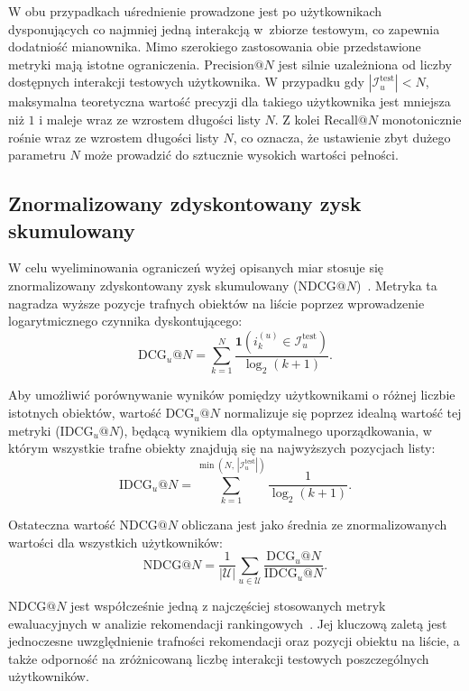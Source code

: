 W obu przypadkach uśrednienie prowadzone jest po użytkownikach dysponujących
co najmniej jedną interakcją w~zbiorze testowym, co zapewnia dodatniość
mianownika. Mimo szerokiego zastosowania obie przedstawione metryki mają istotne ograniczenia. $\text{Precision}@N$ jest silnie uzależniona od liczby dostępnych interakcji testowych użytkownika. W przypadku gdy $|\mathcal{I}_u^{\text{test}}| < N$, maksymalna teoretyczna wartość precyzji dla takiego użytkownika jest mniejsza niż $1$ i maleje wraz ze wzrostem długości listy $N$. Z kolei $\text{Recall}@N$ monotonicznie rośnie wraz ze wzrostem długości listy $N$, co oznacza, że ustawienie zbyt dużego parametru $N$ może prowadzić do sztucznie wysokich wartości pełności.

\subsection{Znormalizowany zdyskontowany zysk skumulowany}
\label{subsec:ndcg}

W celu wyeliminowania ograniczeń wyżej opisanych miar stosuje się znormalizowany zdyskontowany zysk skumulowany ($\text{NDCG}@N$)~\cite{aggarwal2016recommender}. Metryka ta nagradza wyższe pozycje trafnych obiektów na liście poprzez wprowadzenie logarytmicznego czynnika dyskontującego:
\begin{equation}
    \text{DCG}_u@N = \sum_{k=1}^{N} \frac{\mathbf{1}\left( i_k^{(u)} \in \mathcal{I}_u^{\text{test}} \right)}{\log_2(k + 1)}.
\end{equation}

Aby umożliwić porównywanie wyników pomiędzy użytkownikami o różnej liczbie istotnych obiektów, wartość $\text{DCG}_u@N$ normalizuje się poprzez idealną wartość tej metryki ($\text{IDCG}_u@N$), będącą wynikiem dla optymalnego uporządkowania, w którym wszystkie trafne obiekty znajdują się na najwyższych pozycjach listy:
\begin{equation}
    \text{IDCG}_u@N = \sum_{k=1}^{\min\left(N,\, |\mathcal{I}_u^{\text{test}}|\right)} \frac{1}{\log_2(k + 1)}.
\end{equation}

Ostateczna wartość $\text{NDCG}@N$ obliczana jest jako średnia ze znormalizowanych wartości dla wszystkich użytkowników:
\begin{equation}
    \text{NDCG}@N = \frac{1}{|\mathcal{U}|} \sum_{u \in \mathcal{U}} \frac{\text{DCG}_u@N}{\text{IDCG}_u@N}.
\end{equation}

$\text{NDCG}@N$ jest współcześnie jedną z najczęściej stosowanych metryk ewaluacyjnych w analizie rekomendacji rankingowych~\cite{ricci2015recommender,kang2018self,sun2019bert4rec}. Jej kluczową zaletą jest jednoczesne uwzględnienie trafności rekomendacji oraz pozycji obiektu na liście, a także odporność na zróżnicowaną liczbę interakcji testowych poszczególnych użytkowników.

